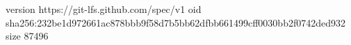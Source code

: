 version https://git-lfs.github.com/spec/v1
oid sha256:232be1d972661ac878bbb9f58d7b5bb62dfbb661499cff0030bb2f0742ded932
size 87496
